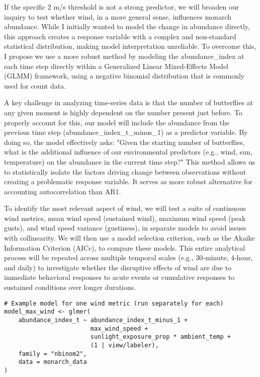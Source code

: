 If the specific 2 m/s threshold is not a strong predictor, we will broaden our inquiry to test whether wind, in a more general sense, influences monarch abundance. While I initially wanted to model the change in abundance directly, this approach creates a response variable with a complex and non-standard statistical distribution, making model interpretation unreliable. To overcome this, I propose we use a more robust method by modeling the abundance_index at each time step directly within a Generalized Linear Mixed-Effects Model (GLMM) framework, using a negative binomial distribution that is commonly used for count data.

A key challenge in analyzing time-series data is that the number of butterflies at any given moment is highly dependent on the number present just before. To properly account for this, our model will include the abundance from the previous time step (abundance_index_t_minus_1) as a predictor variable. By doing so, the model effectively asks: "Given the starting number of butterflies, what is the additional influence of our environmental predictors (e.g., wind, sun, temperature) on the abundance in the current time step?" This method allows us to statistically isolate the factors driving change between observations without creating a problematic response variable. It serves as more robust alternative for accounting autocorrelation than AR1.

To identify the most relevant aspect of wind, we will test a suite of continuous wind metrics, mean wind speed (sustained wind), maximum wind speed (peak gusts), and wind speed variance (gustiness), in separate models to avoid issues with collinearity. We will then use a model selection criterion, such as the Akaike Information Criterion (AICc), to compare these models. This entire analytical process will be repeated across multiple temporal scales (e.g., 30-minute, 4-hour, and daily) to investigate whether the disruptive effects of wind are due to immediate behavioral responses to acute events or cumulative responses to sustained conditions over longer durations.

\begin{verbatim}
# Example model for one wind metric (run separately for each)
model_max_wind <- glmer(
    abundance_index_t ~ abundance_index_t_minus_1 + 
                        max_wind_speed + 
                        sunlight_exposure_prop * ambient_temp +
                        (1 | view/labeler),
    family = "nbinom2",
    data = monarch_data
)
\end{verbatim}


